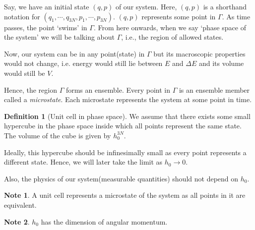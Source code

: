 \documentclass[10pt, a4paper]{extarticle}
\theoremstyle{definition}
\newtheorem{defn}{Definition}
\newtheorem*{note*}{Note}
\begin{document}
Say, we have an initial state $(q,p)$ of our system. Here, $(q,p)$ is a shorthand notation for $(q_1,\cdots,q_{3N},p_1,\cdots,p_{3N})$. $(q,p)$ represents some point in $\Gamma$. As time passes, the point `swims' in $\Gamma$. From here onwards, when we say `phase space of the system' we will be talking about $\Gamma$, i.e., the region of allowed states.

Now, our system can be in any point(state) in $\Gamma$ but its macroscopic properties would not change, i.e. energy would still lie between $E$ and $\Delta E$ and its volume would still be $V$.

Hence, the region $\Gamma$ forms an ensemble. Every point in $\Gamma$ is an ensemble member called a \emph{microstate}. Each microstate represents the system at some point in time.

\begin{defn}[Unit cell in phase space]
	We assume that there exists some small hypercube in the phase space inside which all points represent the same state. The volume of the cube is given by $h_0^{3N}$.

	Ideally, this hypercube should be infinesimally small as every point represents a different state. Hence, we will later take the limit as $h_0\to 0$.

	Also, the physics of our system(measurable quantities) should not depend on $h_0$.
\end{defn}
\begin{note*}
	A unit cell represents a microstate of the system as all points in it are equivalent.
\end{note*}
\begin{note*}
	$h_0$ has the dimension of angular momentum.
\end{note*}
\end{document}
